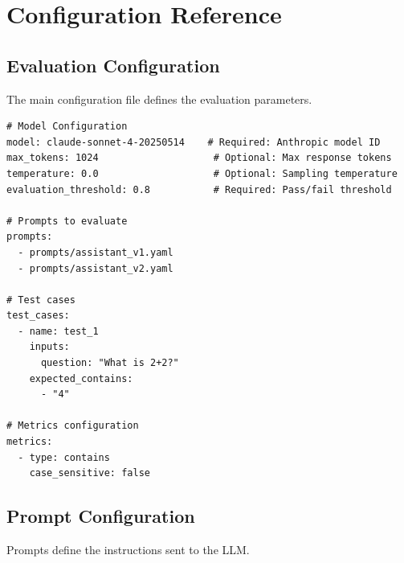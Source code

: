 \documentclass[11pt,a4paper]{report}
\begin{document}

\chapter{Configuration Reference}

\section{Evaluation Configuration}

The main configuration file defines the evaluation parameters.

\begin{lstlisting}[style=yaml,title={configs/eval\_<name>.yaml}]
# Model Configuration
model: claude-sonnet-4-20250514    # Required: Anthropic model ID
max_tokens: 1024                    # Optional: Max response tokens
temperature: 0.0                    # Optional: Sampling temperature
evaluation_threshold: 0.8           # Required: Pass/fail threshold

# Prompts to evaluate
prompts:
  - prompts/assistant_v1.yaml
  - prompts/assistant_v2.yaml

# Test cases
test_cases:
  - name: test_1
    inputs:
      question: "What is 2+2?"
    expected_contains:
      - "4"

# Metrics configuration
metrics:
  - type: contains
    case_sensitive: false
\end{lstlisting}

\section{Prompt Configuration}

Prompts define the instructions sent to the LLM.
\end{document}
